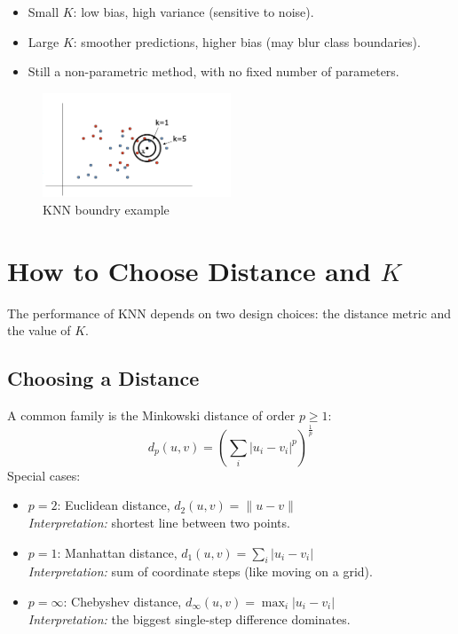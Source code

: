 \documentclass[11pt]{article}
\begin{document}
\begin{itemize}
    \item Small $K$: low bias, high variance (sensitive to noise).
    \item Large $K$: smoother predictions, higher bias (may blur class boundaries).
    \item Still a non-parametric method, with no fixed number of parameters.
\end{itemize}
	\begin{figure}[h]
		\centering
		\includegraphics[width=0.5\textwidth]{../imgs/knn.png} %
		\caption{KNN boundry example}
	\end{figure}

	
\section*{How to Choose Distance and $K$}
The performance of KNN depends on two design choices: the distance metric and the value of $K$.

\subsection*{Choosing a Distance}
A common family is the Minkowski distance of order $p \geq 1$:
\[
    d_p(u, v) = \left( \sum_i |u_i - v_i|^p \right)^{\tfrac{1}{p}}
\]
Special cases:
\begin{itemize}
    \item $p = 2$: Euclidean distance, $d_2(u,v) = \|u - v\|$ \\
          \textit{Interpretation:} shortest line between two points.
    \item $p = 1$: Manhattan distance, $d_1(u,v) = \sum_i |u_i - v_i|$ \\
          \textit{Interpretation:} sum of coordinate steps (like moving on a grid).
    \item $p = \infty$: Chebyshev distance, $d_\infty(u,v) = \max_i |u_i - v_i|$ \\
          \textit{Interpretation:} the biggest single-step difference dominates.
\end{itemize}
\end{document}
